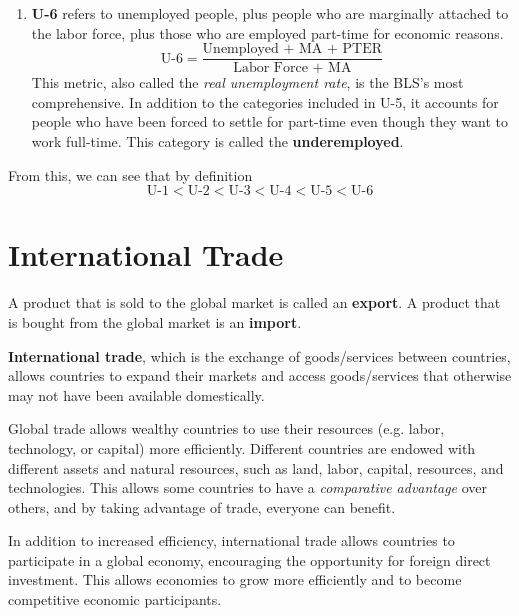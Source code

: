 \documentclass{article}
\begin{document}
\begin{definition}
\begin{enumerate}
        \item \textbf{U-6} refers to unemployed people, plus people who are marginally attached to the labor force, plus those who are employed part-time for economic reasons. 
        \begin{equation}
          \text{U-6} = \frac{\text{Unemployed + MA + PTER}}{\text{Labor Force + MA}}
        \end{equation}
        This metric, also called the \textit{real unemployment rate}, is the BLS's most comprehensive. In addition to the categories included in U-5, it accounts for people who have been forced to settle for part-time even though they want to work full-time. This category is called the \textbf{underemployed}. 
      \end{enumerate}
      From this, we can see that by definition
      \begin{equation}
        \text{U-1} < \text{U-2} < \text{U-3} < \text{U-4} < \text{U-5} < \text{U-6}
      \end{equation}
    \end{definition}

\section{International Trade}

  \begin{definition}
    \label{def:imports-exports}
    A product that is sold to the global market is called an \textbf{export}. A product that is bought from the global market is an \textbf{import}. 
  \end{definition}

  \begin{definition}
    \label{def:international-trade}
    \textbf{International trade}, which is the exchange of goods/services between countries, allows countries to expand their markets and access goods/services that otherwise may not have been available domestically. 

    Global trade allows wealthy countries to use their resources (e.g. labor, technology, or capital) more efficiently. Different countries are endowed with different assets and natural resources, such as land, labor, capital, resources, and technologies. This allows some countries to have a \textit{comparative advantage} over others, and by taking advantage of trade, everyone can benefit. 

    In addition to increased efficiency, international trade allows countries to participate in a global economy, encouraging the opportunity for foreign direct investment. This allows economies to grow more efficiently and to become competitive economic participants. 
  \end{definition}
\end{document}
